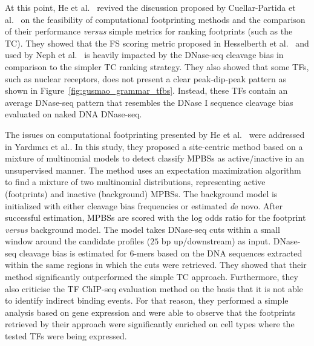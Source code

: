 At this point, He et al.~\cite{he2014} revived the discussion proposed by Cuellar-Partida et al.~\cite{cuellar2012} on the feasibility of computational footprinting methods and the comparison of their performance \emph{versus} simple metrics for ranking footprints (such as the TC). They showed that the FS scoring metric proposed in Hesselberth et al.~\cite{hesselberth2009} and used by Neph et al.~\cite{neph2012a} is heavily impacted by the DNase-seq cleavage bias in comparison to the simpler TC ranking strategy. They also showed that some TFs, such as nuclear receptors, does not present a clear peak-dip-peak pattern as shown in Figure~\ref{fig:gusmao_grammar_tfbs}. Instead, these TFs contain an average DNase-seq pattern that resembles the DNase I sequence cleavage bias evaluated on naked DNA DNase-seq.

The issues on computational footprinting presented by He et al.~\cite{he2014} were addressed in Yard{\i}mc{\i} et al.\cite{yardimci2014}. In this study, they proposed a site-centric method based on a mixture of multinomial models to detect classify MPBSs as active/inactive in an unsupervised manner. The method uses an expectation maximization algorithm to find a mixture of two multinomial distributions, representing active (footprints) and inactive (background) MPBSs. The background model is initialized with either cleavage bias frequencies or estimated {\emph de novo}. After successful estimation, MPBSs are scored with the log odds ratio for the footprint \emph{versus} background model. The model takes DNase-seq cuts within a small window around the candidate profiles ($25$ bp up/downstream) as input. DNase-seq cleavage bias is estimated for 6-mers based on the DNA sequences extracted within the same regions in which the cuts were retrieved. They showed that their method significantly outperformed the simple TC approach. Furthermore, they also criticise the TF ChIP-seq evaluation method on the basis that it is not able to identify indirect binding events. For that reason, they performed a simple analysis based on gene expression and were able to observe that the footprints retrieved by their approach were significantly enriched on cell types where the tested TFs were being expressed.


